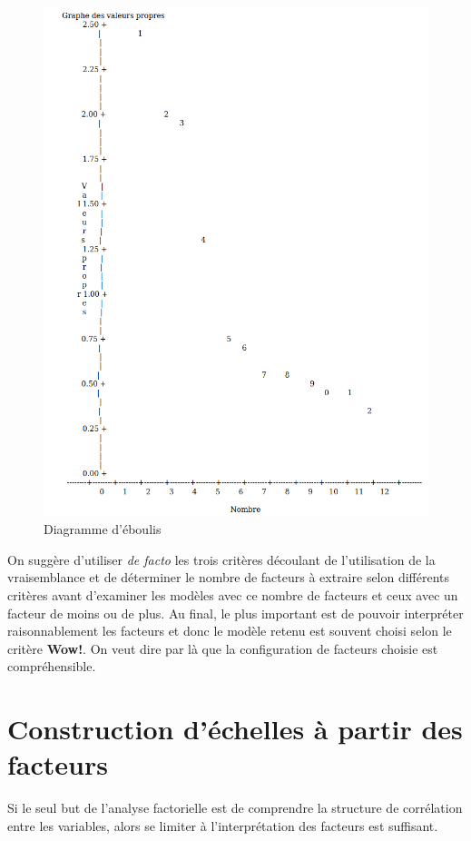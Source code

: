 \documentclass[
]{book}
\theoremstyle{definition}
\theoremstyle{definition}
\theoremstyle{definition}
\theoremstyle{remark}
\begin{document}
\begin{figure}

{\centering \includegraphics[width=0.65\linewidth]{figures/01-facto-e6} 

}

\caption{Diagramme d'éboulis}\label{fig:fig1p6}
\end{figure}

On suggère d'utiliser \emph{de facto} les trois critères découlant de l'utilisation de la vraisemblance et de déterminer le nombre de facteurs à extraire selon différents critères avant d'examiner les modèles avec ce nombre de facteurs et ceux
avec un facteur de moins ou de plus. Au final, le plus important est de pouvoir interpréter raisonnablement les facteurs et donc le modèle retenu est souvent choisi selon le critère \textbf{Wow!}. On veut dire par là que la configuration de facteurs choisie est compréhensible.

\hypertarget{construction-duxe9chelles-uxe0-partir-des-facteurs}{%
\section{Construction d'échelles à partir des facteurs}\label{construction-duxe9chelles-uxe0-partir-des-facteurs}}

Si le seul but de l'analyse factorielle est de comprendre la structure de corrélation entre les variables, alors se limiter à l'interprétation des facteurs est suffisant.
\end{document}
